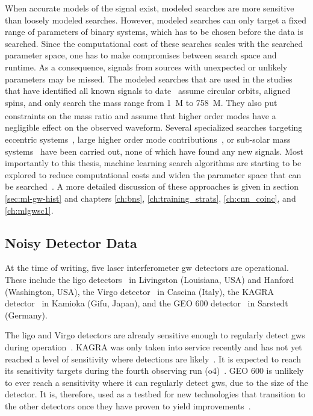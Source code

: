 When accurate models of the signal exist, modeled searches are more sensitive than loosely modeled searches. However, modeled searches can only target a fixed range of parameters of binary systems, which has to be chosen before the data is searched. Since the computational cost of these searches scales with the searched parameter space, one has to make compromises between search space and runtime. As a consequence, signals from sources with unexpected or unlikely parameters may be missed. The modeled searches that are used in the studies that have identified all known signals to date~\cite{LIGOScientific:2021djp, Nitz:2021zwj, Venumadhav:2019lyq, Olsen:2022pin} assume circular orbits, aligned spins, and only search the mass range from \SI{1}{M_\odot} to \SI{758}{M_\odot}. They also put constraints on the mass ratio and assume that higher order modes have a negligible effect on the observed waveform. Several specialized searches targeting eccentric systems~\cite{Lenon:2021zac}, large higher order mode contributions~\cite{Chandra:2022ixv}, or sub-solar mass systems~\cite{LIGOScientific:2019kan, Nitz:2020bdb, Nitz:2021mzz, Nitz:2021vqh, Nitz:2022ltl} have been carried out, none of which have found any new signals. Most importantly to this thesis, machine learning search algorithms are starting to be explored to reduce computational costs and widen the parameter space that can be searched~\cite{George:2016hay, Schafer:2020kor, Cuoco:2020ogp, Wei:2020ztw, Schafer:2022dxv}. A more detailed discussion of these approaches is given in section \ref{sec:ml-gw-hist} and chapters \ref{ch:bns}, \ref{ch:training_strats}, \ref{ch:cnn_coinc}, and \ref{ch:mlgwsc1}.

\subsection{Noisy Detector Data}\label{sec:detectors}
At the time of writing, five laser interferometer \acrshort{gw} detectors are operational. These include the \acrshort{ligo} detectors~\cite{LIGOScientific:2014pky} in Livingston (Louisiana, USA) and Hanford (Washington, USA), the Virgo detector~\cite{VIRGO:2014yos} in Cascina (Italy), the KAGRA detector~\cite{KAGRA:2018plz} in Kamioka (Gifu, Japan), and the GEO 600 detector~\cite{Luck:2010rt, Affeldt:2014rza, Dooley:2015fpa} in Sarstedt (Germany).

The \acrshort{ligo} and Virgo detectors are already sensitive enough to regularly detect \acrshort{gw}s during operation~\cite{LIGOScientific:2021djp}. KAGRA was only taken into service recently and has not yet reached a level of sensitivity where detections are likely~\cite{KAGRA:2022twx}. It is expected to reach its sensitivity targets during the fourth observing run (\acrshort{o4})~\cite{KAGRA:2018plz}. GEO 600 is unlikely to ever reach a sensitivity where it can regularly detect \acrshort{gw}s, due to the size of the detector. It is, therefore, used as a testbed for new technologies that transition to the other detectors once they have proven to yield improvements~\cite{GEO:2022aaa}.


